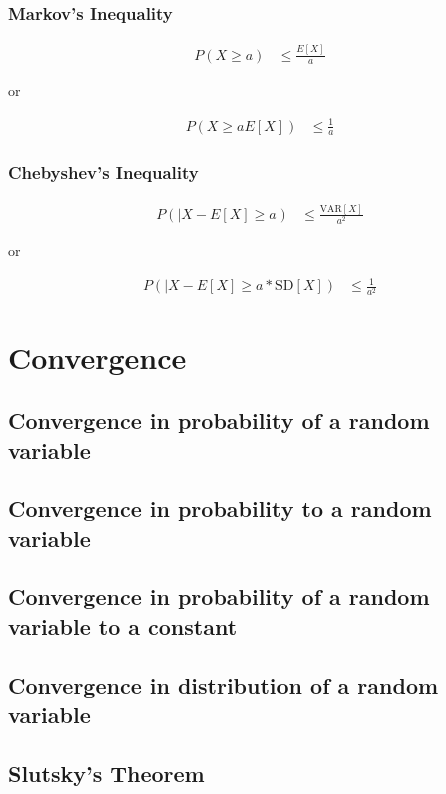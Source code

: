 \documentclass[10pt,a4paper]{book}
\begin{document}
\subsection{Markov's Inequality}

\begin{align}
P(X \ge a) &\le \frac{E[X]}{a}
\end{align}

or 

\begin{align}
P(X \ge aE[X]) &\le \frac{1}{a}
\end{align}

\subsection{Chebyshev's Inequality}

\begin{align}
P(|X - E[X] \ge a) &\le \frac{\text{VAR}[X]}{a^2}
\end{align}

or

\begin{align}
P(|X - E[X] \ge a*\text{SD}[X]) &\le \frac{1}{a^2}
\end{align}

	\chapter{Convergence}
	\section{Convergence in probability of a random variable}
	\section{Convergence in probability to a random variable}
	\section{Convergence in probability of a random variable to a constant}
	\section{Convergence in distribution of a random variable}
	\section{Slutsky's Theorem}
	
\end{document}
